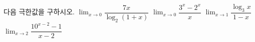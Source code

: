 다음 극한값을 구하시오.
 $\displaystyle\lim_{x\to 0}\dfrac{7x}{\log_2(1+x)}$
 $\displaystyle\lim_{x\to 0}\dfrac{3^x-2^x}{x}$
 $\displaystyle\lim_{x\to 1}\dfrac{\log_3 x}{1-x}$
 $\displaystyle\lim_{x\to 2}\dfrac{10^{x-2}-1}{x-2}$
